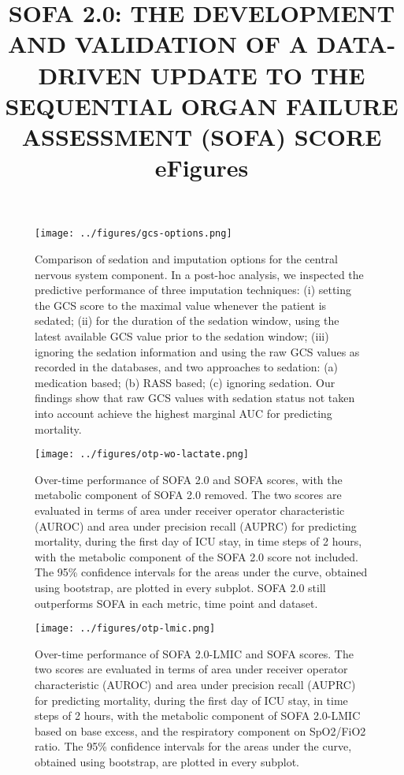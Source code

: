 \documentclass[
]{article}
\title{SOFA 2.0: THE DEVELOPMENT AND VALIDATION OF A DATA-DRIVEN UPDATE TO THE SEQUENTIAL ORGAN FAILURE ASSESSMENT (SOFA) SCORE \\ eFigures}
\author{}
\date{\vspace{-2.5em}}
\begin{document}
\maketitle

\begin{figure}
    \centering
    \texttt{[image: ../figures/gcs-options.png]}
    \caption{Comparison of sedation and imputation options for the central nervous system component. In a post-hoc analysis, we inspected the predictive performance of three imputation techniques: (i) setting the GCS score to the maximal value whenever the patient is sedated; (ii) for the duration of the sedation window, using the latest available GCS value prior to the sedation window; (iii) ignoring the sedation information and using the raw GCS values as recorded in the databases, and two approaches to sedation: (a) medication based; (b) RASS based; (c) ignoring sedation. Our findings show that raw GCS values with sedation status not taken into account achieve the highest marginal AUC for predicting mortality.}
\end{figure}


\begin{figure}
    \centering
    \texttt{[image: ../figures/otp-wo-lactate.png]}
    \caption{Over-time performance of SOFA 2.0 and SOFA scores, with the metabolic component of SOFA 2.0 removed. The two scores are evaluated in terms of area under receiver operator characteristic (AUROC) and area under precision recall (AUPRC) for predicting mortality, during the first day of ICU stay, in time steps of 2 hours, with the metabolic component of the SOFA 2.0 score not included. The 95\% confidence intervals for the areas under the curve, obtained using bootstrap, are plotted in every subplot. SOFA 2.0 still outperforms SOFA in each metric, time point and dataset.}
\end{figure}

\begin{figure}
    \centering
    \texttt{[image: ../figures/otp-lmic.png]}
    \caption{Over-time performance of SOFA 2.0-LMIC and SOFA scores. The two scores are evaluated in terms of area under receiver operator characteristic (AUROC) and area under precision recall (AUPRC) for predicting mortality, during the first day of ICU stay, in time steps of 2 hours, with the metabolic component of SOFA 2.0-LMIC based on base excess, and the respiratory component on SpO2/FiO2 ratio. The 95\% confidence intervals for the areas under the curve, obtained using bootstrap, are plotted in every subplot.}
\end{figure}
\end{document}
